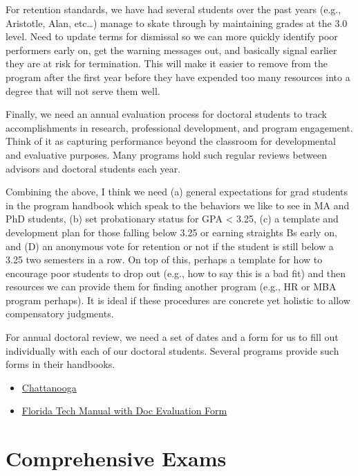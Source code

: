 \documentclass[
]{book}
\providecommand{\tightlist}{%
  \setlength{\itemsep}{0pt}\setlength{\parskip}{0pt}}
\begin{document}
For retention standards, we have had several students over the past years (e.g., Aristotle, Alan, etc\ldots) manage to skate through by maintaining grades at the 3.0 level. Need to update terms for dismissal so we can more quickly identify poor performers early on, get the warning messages out, and basically signal earlier they are at risk for termination. This will make it easier to remove from the program after the first year before they have expended too many resources into a degree that will not serve them well.

Finally, we need an annual evaluation process for doctoral students to track accomplishments in research, professional development, and program engagement. Think of it as capturing performance beyond the classroom for developmental and evaluative purposes. Many programs hold such regular reviews between advisors and doctoral students each year.

Combining the above, I think we need (a) general expectations for grad students in the program handbook which speak to the behaviors we like to see in MA and PhD students, (b) set probationary status for GPA \textless{} 3.25, (c) a template and development plan for those falling below 3.25 or earning straights Bs early on, and (D) an anonymous vote for retention or not if the student is still below a 3.25 two semesters in a row. On top of this, perhaps a template for how to encourage poor students to drop out (e.g., how to say this is a bad fit) and then resources we can provide them for finding another program (e.g., HR or MBA program perhaps). It is ideal if these procedures are concrete yet holistic to allow compensatory judgments.

For annual doctoral review, we need a set of dates and a form for us to fill out individually with each of our doctoral students. Several programs provide such forms in their handbooks.

\begin{itemize}
\tightlist
\item
  \href{http://catalog.utc.edu/content.php?catoid=15\&navoid=465\#Academic_Dismissal}{Chattanooga}
\item
  \href{https://www.fit.edu/media/site-specific/wwwfitedu/college-of-psychology-and-liberal-arts/io/documents/2019-IO-Student-Handbook.pdf}{Florida Tech Manual with Doc Evaluation Form}
\end{itemize}

\hypertarget{comps}{%
\chapter{Comprehensive Exams}\label{comps}}
\end{document}
